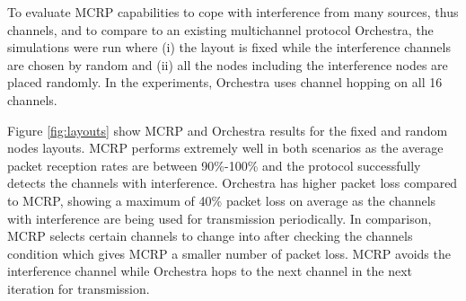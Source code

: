 To evaluate MCRP capabilities to cope with interference from many sources, thus channels, and to compare to an existing multichannel protocol Orchestra, the simulations were run where (i) the layout is fixed while the interference channels are chosen by random and (ii) all the nodes including the interference nodes are placed randomly. 
In the experiments, Orchestra uses channel hopping on all 16 channels.  

Figure \ref{fig:layouts} show MCRP and Orchestra results for the fixed and random nodes layouts.
MCRP performs extremely well in both scenarios as the average packet reception rates are between 90\%-100\% and the protocol successfully detects the channels with interference.
Orchestra has higher packet loss compared to MCRP, showing a maximum of 40\% packet loss on average as the channels with interference are being used for transmission periodically.
In comparison, MCRP selects certain channels to change into after checking the channels condition which gives MCRP a smaller number of packet loss.
MCRP avoids the interference channel while Orchestra hops to the next channel in the next iteration for transmission.



